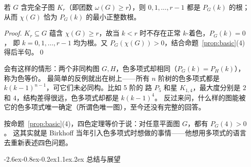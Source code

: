 \documentclass[10pt]{article}
\makeatletter
\renewcommand\section{\@startsection{section}{1}{\z@}%
  {-2.6ex\@plus -0.8ex\@minus -0.2ex}{1.1ex\@plus.2ex}%
  {\normalfont\large\bfseries}}
\newcommand{\chrom}[2]{P_{#1}(#2)}        %
\newcommand{\chrnum}{\chi}                %
\makeatother
\begin{document}
\begin{proposition}[整数根]\label{prop:introot}
若 $G$ 含完全子图 $K_r$（即团数 $\omega(G)\ge r$），则 $0,1,\dots,r-1$ 都是 $\chrom{G}{k}$ 的根；
从而 $\chrnum(G)$ 恰为 $\chrom{G}{k}$ 的最小正整数根。
\end{proposition}
\begin{proof}
$K_r\subseteq G$ 蕴含 $\chrnum(G)\ge r$，故当 $k<r$ 时不存在正常 $k$-着色，$\chrom{G}{k}=0$，
即 $k=0,1,\dots,r-1$ 均为根。又 $\chrom{G}{\chrnum(G)}>0$，结合命题~\ref{prop:basic}(4) 得后半句。\qed
\end{proof}

\begin{remark}[色多项式不能完全确定图]
会有这样的情形：两个非同构图 $G,H$，色多项式却相同（$\chrom{G}{k}=\chrom{H}{k}$），称为色等价。
最简单的反例就出在树上——所有 $n$ 阶树的色多项式都是 $k(k-1)^{n-1}$，可它们未必同构。比如 5 阶的
路 $P_5$ 和星 $K_{1,4}$，最大度分别是 $2$ 和 $4$，结构差得很远，色多项式却都是 $k(k-1)^{4}$。
反过来问，什么样的图能被它的色多项式唯一确定（所谓色唯一图），至今还没有完整的回答。

\begin{center}
\end{center}
\end{remark}

\begin{remark}[与四色定理的联系]
按命题~\ref{prop:basic}(4)，四色定理等价于说：对任意平面图 $G$，都有 $\chrom{G}{4}>0$。
这其实就是 Birkhoff 当年引入色多项式时想做的事情——他想用多项式的语言去重新表述四色问题。
\end{remark}

\section{总结与展望}
\end{document}
